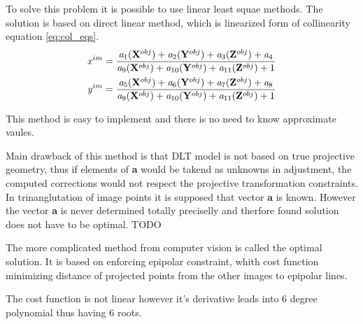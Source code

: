 \documentclass[a4paper,12pt]{report}
\newcommand{\evect}[1]{
{\bf #1}
}
\newcommand{\escal}[1]{
{\it #1}
}
\begin{document}
To solve this problem it is possible to use linear least squae methods. The solution is based 
on direct linear method, which is linearized form of collinearity equation \eqref{eq:col_eqs}.
\begin{equation}
\label{eq:col_eqs}
\begin{split}
&\escal{x}^{im} = \frac{\escal{a}_{1}(\evect{X}^{obj}) + 
                                  \escal{a}_{2}(\evect{Y}^{obj}) + 
                                  \escal{a}_{3}(\evect{Z}^{obj}) +
                                  \escal{a}_{4}
                                  }{
				  \escal{a}_{9}(\evect{X}^{obj}) + 
                                  \escal{a}_{10}(\evect{Y}^{obj}) + 
                                  \escal{a}_{11}(\evect{Z}^{obj}) +
                                   1  
                                  } \\
&\escal{y}^{im} = \frac{\escal{a}_{5}(\evect{X}^{obj}) + 
                                  \escal{a}_{6}(\evect{Y}^{obj}) + 
                                  \escal{a}_{7}(\evect{Z}^{obj}) +                                 
                                  \escal{a}_{8}
                                  }{
				  \escal{a}_{9}(\evect{X}^{obj}) + 
                                  \escal{a}_{10}(\evect{Y}^{obj}) + 
                                  \escal{a}_{11}(\evect{Z}^{obj}) +    
                                  1
                                  }
\end{split}
\end{equation}

This method is easy to implement and there is no need to know approximate vaules.


Main drawback of this method is that DLT model is not based on true projective geometry, thus 
if elements of \evect{a} would be takend as unknowns in adjustment, the computed corrections 
would not respect the projective transformation constraints.  In trinanglutation of image points 
it is supposed that vector \evect{a} is known. However the vector \evect{a} is never determined 
totally preciselly and therfore found solution does not have to be optimal.
TODO

The more complicated method from computer vision is called the optimal solution. 
It is based on enforcing epipolar constraint, whith cost function 
minimizing distance of projected points from the other images to epipolar lines.

The cost function is not linear however it's derivative leads into 6 degree polynomial thus 
having 6 roots.
\end{document}
